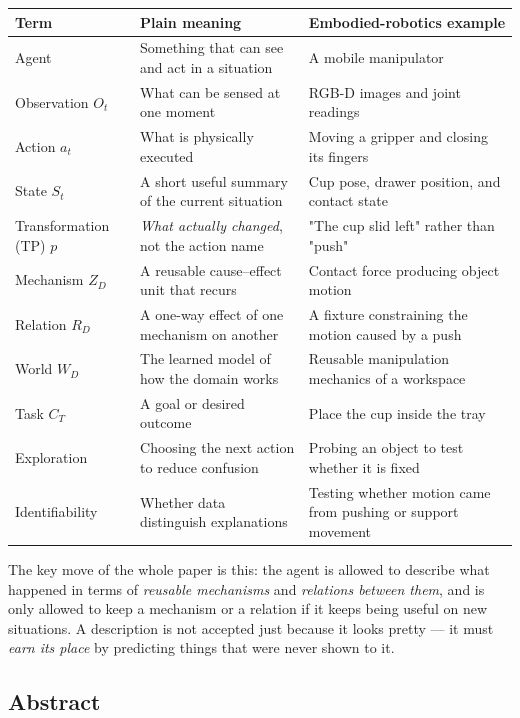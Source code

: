 \documentclass[11pt]{article}
\newenvironment{plainword}{%
  \par\medskip\noindent\begin{minipage}{\textwidth}%
  \color{gray!75!black}\small\itshape
}{%
  \end{minipage}\par\medskip}
\begin{document}
\begin{center}
\small
\begin{tabularx}{\textwidth}{@{}p{}p{}X@{}}
\toprule
Term & Plain meaning & Embodied-robotics example \\
\midrule
Agent & Something that can see and act in a situation & A mobile manipulator \\
Observation $O_t$ & What can be sensed at one moment & RGB-D images and joint readings \\
Action $a_t$ & What is physically executed & Moving a gripper and closing its fingers \\
State $S_t$ & A short useful summary of the current situation & Cup pose, drawer position, and contact state \\
Transformation (TP) $p$ & \emph{What actually changed}, not the action name & "The cup slid left" rather than "push" \\
Mechanism $Z_D$ & A reusable cause--effect unit that recurs & Contact force producing object motion \\
Relation $R_D$ & A one-way effect of one mechanism on another & A fixture constraining the motion caused by a push \\
World $W_D$ & The learned model of how the domain works & Reusable manipulation mechanics of a workspace \\
Task $C_T$ & A goal or desired outcome & Place the cup inside the tray \\
Exploration & Choosing the next action to reduce confusion & Probing an object to test whether it is fixed \\
Identifiability & Whether data distinguish explanations & Testing whether motion came from pushing or support movement \\
\bottomrule
\end{tabularx}
\end{center}

\begin{plainword}
The key move of the whole paper is this: the agent is allowed to describe what happened in terms of \emph{reusable mechanisms}
and \emph{relations between them}, and is only allowed to keep a mechanism or a relation if it keeps being useful on new situations.
A description is not accepted just because it looks pretty --- it must \emph{earn its place} by predicting things that were never shown to it.
\end{plainword}

\subsection*{Abstract}
\end{document}
